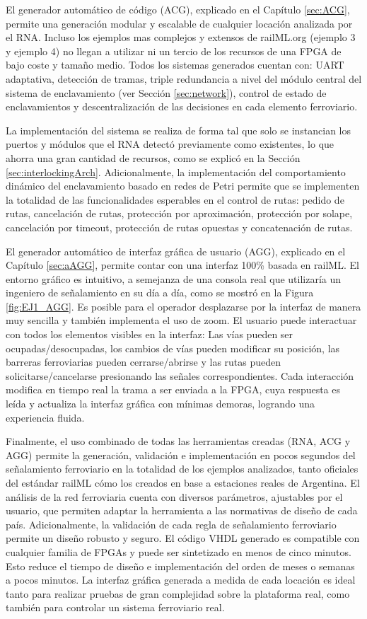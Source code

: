El generador automático de código (ACG), explicado en el Capítulo \ref{sec:ACG}, permite una generación modular y escalable de cualquier locación analizada por el RNA. Incluso los ejemplos mas complejos y extensos de railML.org (ejemplo 3 y ejemplo 4) no llegan a utilizar ni un tercio de los recursos de una FPGA de bajo coste y tamaño medio. Todos los sistemas generados cuentan con: UART adaptativa, detección de tramas, triple redundancia a nivel del módulo central del sistema de enclavamiento (ver Sección \ref{sec:network}), control de estado de enclavamientos y descentralización de las decisiones en cada elemento ferroviario.

La implementación del sistema se realiza de forma tal que solo se instancian los puertos y módulos que el RNA detectó previamente como existentes, lo que ahorra una gran cantidad de recursos, como se explicó en la Sección \ref{sec:interlockingArch}. Adicionalmente, la implementación del comportamiento dinámico del enclavamiento basado en redes de Petri permite que se implementen la totalidad de las funcionalidades esperables en el control de rutas: pedido de rutas, cancelación de rutas, protección por aproximación, protección por solape, cancelación por timeout, protección de rutas opuestas y concatenación de rutas.

El generador automático de interfaz gráfica de usuario (AGG), explicado en el Capítulo \ref{sec:aAGG}, permite contar con una interfaz 100\% basada en railML. El entorno gráfico es intuitivo, a semejanza de una consola real que utilizaría un ingeniero de señalamiento en su día a día, como se mostró en la Figura \ref{fig:EJ1_AGG}. Es posible para el operador desplazarse por la interfaz de manera muy sencilla y también implementa el uso de zoom. El usuario puede interactuar con todos los elementos visibles en la interfaz: Las vías pueden ser ocupadas/desocupadas, los cambios de vías pueden modificar su posición, las barreras ferroviarias pueden cerrarse/abrirse y las rutas pueden solicitarse/cancelarse presionando las señales correspondientes. Cada interacción modifica en tiempo real la trama a ser enviada a la FPGA, cuya respuesta es leída y actualiza la interfaz gráfica con mínimas demoras, logrando una experiencia fluida.

Finalmente, el uso combinado de todas las herramientas creadas (RNA, ACG y AGG) permite la generación, validación e implementación en pocos segundos del señalamiento ferroviario en la totalidad de los ejemplos analizados, tanto oficiales del estándar railML cómo los creados en base a estaciones reales de Argentina. El análisis de la red ferroviaria cuenta con diversos parámetros, ajustables por el usuario, que permiten adaptar la herramienta a las normativas de diseño de cada país. Adicionalmente, la validación de cada regla de señalamiento ferroviario permite un diseño robusto y seguro. El código VHDL generado es compatible con cualquier familia de FPGAs y puede ser sintetizado en menos de cinco minutos. Esto reduce el tiempo de diseño e implementación del orden de meses o semanas a pocos minutos. La interfaz gráfica generada a medida de cada locación es ideal tanto para realizar pruebas de gran complejidad sobre la plataforma real, como también para controlar un sistema ferroviario real.

